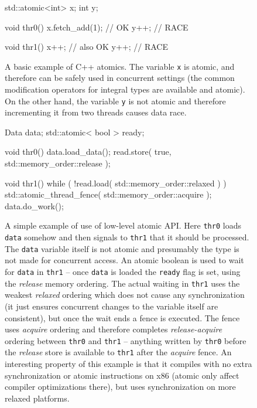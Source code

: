 \begin{figure}[t]
  \begin{cppcode}
    std::atomic<int> x;
    int y;
  \end{cppcode}
  \begin{multicols}{2}
    \begin{cppcode}
      void thr0() {
        x.fetch_add(1); // OK
        y++; // RACE
      }
    \end{cppcode}
    \columnbreak
    \begin{cppcode}
      void thr1() {
        x++; // also OK
        y++; // RACE
      }
    \end{cppcode}
  \end{multicols}
  \vspace{-4ex}
  \caption{A basic example of C++ atomics.
      The variable \texttt{x} is atomic, and therefore can be safely used in
      concurrent settings (the common modification operators for integral types
      are available and atomic).
      On the other hand, the variable \texttt{y} is not atomic and therefore
      incrementing it from two threads causes data race.
  }\label{fig:prel:cppatomic0}
\end{figure}

\begin{figure}[t]
  \begin{cppcode}
    Data data;
    std::atomic< bool > ready;

    void thr0() {
      data.load_data();
      read.store( true, std::memory_order::release );
    }

    void thr1() {
      while ( !read.load( std::memory_order::relaxed ) )
      { }
      std::atomic_thread_fence( std::memory_order::acquire );
      data.do_work();
    }
  \end{cppcode}
  \vspace{-2ex}
  \caption{A simple example of use of low-level atomic API.
      Here \texttt{thr0} loads \texttt{data} somehow and then signals to
      \texttt{thr1} that it should be processed.
      The \texttt{data} variable itself is not atomic and presumably the type
      is not made for concurrent access.
      An atomic boolean is used to wait for \texttt{data} in \texttt{thr1} --
      once \texttt{data} is loaded the \texttt{ready} flag is set, using the
      \emph{release} memory ordering.
      The actual waiting in \texttt{thr1} uses the weakest \emph{relaxed}
      ordering which does not cause any synchronization (it just ensures
      concurrent changes to the variable itself are consistent), but once the
      wait ends a fence is executed.
      The fence uses \emph{acquire} ordering and therefore completes
      \emph{release-acquire} ordering between \texttt{thr0} and \texttt{thr1}
      -- anything written by \texttt{thr0} before the \emph{release} store is
      available to \texttt{thr1} after the \emph{acquire} fence.
      An interesting property of this example is that it compiles with no extra
      synchronization or atomic instructions on x86 (atomic only affect
      compiler optimizations there), but uses synchronization on more relaxed
      platforms.
  }\label{fig:prel:cppatomic1}
\end{figure}

